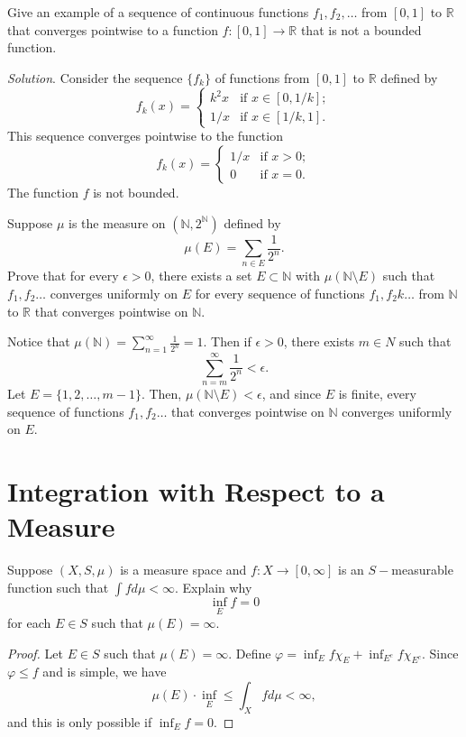 \documentclass[14.5pt]{article}
\newcommand{\N}{\mathbb{N}}
\newcommand{\R}{\mathbb{R}}
\newenvironment{problem}[2][Problem]{\begin{mdframed}[backgroundcolor=gray!10, leftline = false, rightline=false, linewidth=0.25pt]  \begin{trivlist}
\item[\hskip \labelsep {\bfseries #1}\hskip \labelsep {\bfseries #2.}]}{\end{trivlist} \end{mdframed}  }
\begin{document}
\begin{problem}{2E.3} Give an example of a sequence of continuous functions $f_1, f_2, \ldots$  from $[0, 1]$ to $\R$ that converges pointwise to a function $f : [0, 1] \rightarrow \R$ that is not a bounded function.
\end{problem}
\textit{Solution}. Consider the sequence $\{f_k\}$ of functions from $[0,1]$ to $\R$ defined by
\begin{equation*}
    f_k(x) = \begin{cases}
        k^2 x & \text{if } x \in [0, 1 / k]; \\
        1 / x & \text{if } x \in [1/k, 1].
    \end{cases}
\end{equation*}
This sequence converges pointwise to the function
\begin{equation*}
    f_k(x) = \begin{cases}
        1 / x & \text{if } x > 0;\\
        0 & \text{if } x = 0.
    \end{cases}
\end{equation*}
The function $f$ is not bounded.


\begin{problem}{2E.8} Suppose $\mu$ is the measure on $(\N, 2^\N)$ defined by
$$\mu(E) = \sum_{n \in E} \frac{1}{2^n}.$$
Prove that for every $\epsilon > 0$, there exists a set $E \subset \N$ with $\mu(\N \setminus E)$ such that $f_1, f_2 \ldots$ converges uniformly on $E$ for every sequence of functions $f_1, f_2k \ldots$ from $\N$ to $\R$ that converges pointwise on $\N.$
\end{problem}
Notice that $\mu(\N) = \sum_{n=1}^\infty \frac{1}{2^n} = 1$. Then if $\epsilon > 0$, there exists $m \in N$ such that 
$$\sum_{n=m}^\infty \frac{1}{2^n} < \epsilon.$$
Let $E = \{1, 2, \ldots, m - 1\}$. Then, $\mu(\N \setminus E) < \epsilon$, and since $E$ is finite, every sequence of functions $f_1, f_2 \ldots$ that converges pointwise on $\N$ converges uniformly on $E.$

\section*{Integration with Respect to a Measure}
\begin{problem}{3A.1} Suppose $(X, S, \mu)$ is a measure space and $f: X \rightarrow [0, \infty]$ is an $S-$measurable function such that $\int f d\mu < \infty.$ Explain why 
$$\inf_E f = 0$$
for each $E \in S$ such that $\mu(E) = \infty.$
\end{problem}
\begin{proof}
    Let $E \in S$ such that $\mu(E) = \infty.$ Define $\varphi = \inf_E f \chi_E + \inf_{E^c} f \chi_{E^c}.$ Since $\varphi \le f$ and is simple, we have
    $$\mu(E) \cdot \inf_E \leq \int_X f d \mu < \infty,$$
    and this is only possible if $\inf_E f  = 0.$
\end{proof}
\end{document}
